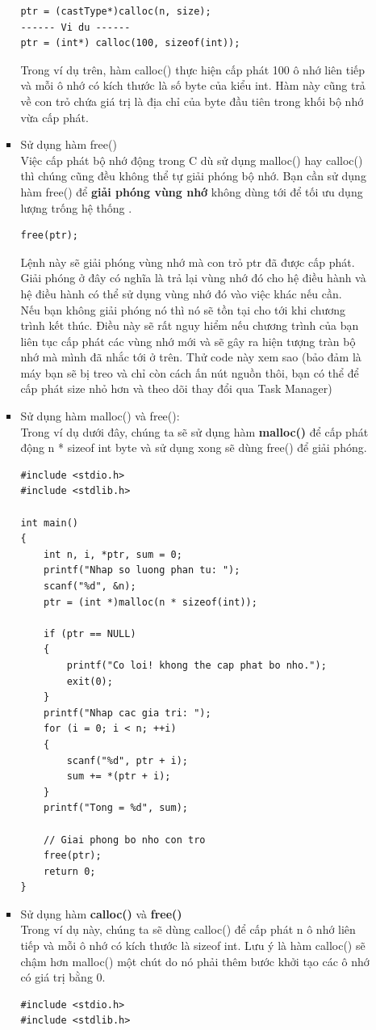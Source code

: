 \documentclass[12pt,a4paper]{article}
\begin{document}
\begin{itemize}
\begin{itemize}
\begin{itemize}
\begin{lstlisting}
ptr = (castType*)calloc(n, size);
------ Vi du ------
ptr = (int*) calloc(100, sizeof(int));
\end{lstlisting}
Trong ví dụ trên, hàm calloc() thực hiện cấp phát 100 ô nhớ liên tiếp và mỗi ô nhớ có kích thước là số byte của kiểu int. Hàm này cũng trả về con trỏ chứa giá trị là địa chỉ của byte đầu tiên trong khối bộ nhớ vừa cấp phát.
\item Sử dụng hàm free()\\
Việc cấp phát bộ nhớ động trong C dù sử dụng malloc() hay calloc() thì chúng cũng đều không thể tự giải phóng bộ nhớ. Bạn cần sử dụng hàm free() để \textbf{giải phóng vùng nhớ} không dùng tới để tối ưu dụng lượng trống hệ thống .
\begin{lstlisting}
free(ptr);
\end{lstlisting}
Lệnh này sẽ giải phóng vùng nhớ mà con trỏ ptr đã được cấp phát. Giải phóng ở đây có nghĩa là trả lại vùng nhớ đó cho hệ điều hành và hệ điều hành có thể sử dụng vùng nhớ đó vào việc khác nếu cần.\\


Nếu bạn không giải phóng nó thì nó sẽ tồn tại cho tới khi chương trình kết thúc. Điều này sẽ rất nguy hiểm nếu chương trình của bạn liên tục cấp phát các vùng nhớ mới và sẽ gây ra hiện tượng tràn bộ nhớ mà mình đã nhắc tới ở trên. Thử code này xem sao (bảo đảm là máy bạn sẽ bị treo và chỉ còn cách ấn nút nguồn thôi, bạn có thể để cấp phát size nhỏ hơn và theo dõi thay đổi qua Task Manager)
\item Sử dụng hàm malloc() và free():\\
Trong ví dụ dưới đây, chúng ta sẽ sử dụng hàm \textbf{malloc()} để cấp phát động n * sizeof int byte và sử dụng xong sẽ dùng free() để giải phóng.
\begin{lstlisting}
#include <stdio.h>
#include <stdlib.h>
 
int main()
{
    int n, i, *ptr, sum = 0;
    printf("Nhap so luong phan tu: ");
    scanf("%d", &n);
    ptr = (int *)malloc(n * sizeof(int));
 
    if (ptr == NULL)
    {
        printf("Co loi! khong the cap phat bo nho.");
        exit(0);
    }
    printf("Nhap cac gia tri: ");
    for (i = 0; i < n; ++i)
    {
        scanf("%d", ptr + i);
        sum += *(ptr + i);
    }
    printf("Tong = %d", sum);
 
    // Giai phong bo nho con tro
    free(ptr);
    return 0;
}
\end{lstlisting}
\item Sử dụng hàm \textbf{calloc()} và \textbf{free()}\\
Trong ví dụ này, chúng ta sẽ dùng calloc() để cấp phát n ô nhớ liên tiếp và mỗi ô nhớ có kích thước là sizeof int. Lưu ý là hàm calloc() sẽ chậm hơn malloc() một chút do nó phải thêm bước khởi tạo các ô nhớ có giá trị bằng 0.
\begin{lstlisting} 
#include <stdio.h>
#include <stdlib.h>
 

\end{lstlisting}
\end{itemize}
\end{itemize}
\end{itemize}
\end{document}
